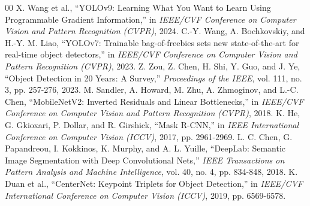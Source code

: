 \documentclass[10pt, conference]{IEEEtran}
\begin{document}
\begin{thebibliography}{00}
 X. Wang et al., ``YOLOv9: Learning What You Want to Learn Using Programmable Gradient Information,'' in \textit{IEEE/CVF Conference on Computer Vision and Pattern Recognition (CVPR)}, 2024.
 C.-Y. Wang, A. Bochkovskiy, and H.-Y. M. Liao, ``YOLOv7: Trainable bag-of-freebies sets new state-of-the-art for real-time object detectors,'' in \textit{IEEE/CVF Conference on Computer Vision and Pattern Recognition (CVPR)}, 2023.
 Z. Zou, Z. Chen, H. Shi, Y. Guo, and J. Ye, ``Object Detection in 20 Years: A Survey,'' \textit{Proceedings of the IEEE}, vol. 111, no. 3, pp. 257-276, 2023.
 M. Sandler, A. Howard, M. Zhu, A. Zhmoginov, and L.-C. Chen, ``MobileNetV2: Inverted Residuals and Linear Bottlenecks,'' in \textit{IEEE/CVF Conference on Computer Vision and Pattern Recognition (CVPR)}, 2018.
 K. He, G. Gkioxari, P. Dollar, and R. Girshick, ``Mask R-CNN,'' in \textit{IEEE International Conference on Computer Vision (ICCV)}, 2017, pp. 2961-2969.
 L. C. Chen, G. Papandreou, I. Kokkinos, K. Murphy, and A. L. Yuille, ``DeepLab: Semantic Image Segmentation with Deep Convolutional Nets,'' \textit{IEEE Transactions on Pattern Analysis and Machine Intelligence}, vol. 40, no. 4, pp. 834-848, 2018.
 K. Duan et al., ``CenterNet: Keypoint Triplets for Object Detection,'' in \textit{IEEE/CVF International Conference on Computer Vision (ICCV)}, 2019, pp. 6569-6578.
\end{thebibliography}
\end{document}
